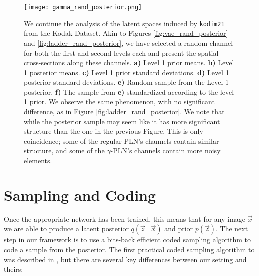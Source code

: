 \begin{figure}
  \centering
  \texttt{[image: gamma\_rand\_posterior.png]}
  \caption{We continue the analysis of the latent spaces induced by
    \texttt{kodim21} from the Kodak Dataset. Akin to Figures
    \ref{fig:vae_rand_posterior} and \ref{fig:ladder_rand_posterior},
    we have selected a random channel for both the
    first and second levels each and present the spatial cross-sections along these
    channels. \textbf{a)} Level 1 prior means. \textbf{b)} Level 1 posterior means.
    \textbf{c)} Level 1 prior standard deviations. \textbf{d)} Level 1 posterior
    standard deviations. \textbf{e)} Random sample from the Level 1 posterior.
    \textbf{f)} The sample from \textbf{e)} standardized according to the level
    1 prior. We observe the same phenomenon, with no significant difference, as
    in Figure \ref{fig:ladder_rand_posterior}. We note that while the posterior
    sample may seem like it has more significant structure than the one in the
    previous Figure. This is only coincidence; some of the regular PLN's
    channels contain similar structure, and some of the $\gamma$-PLN's channels
    contain more noisy elements.
  }
  \label{fig:gamma_rand_posterior}
\end{figure}

\section{Sampling and Coding}
\label{sec:coded_sampling}
\par
Once the appropriate network has been trained, this means that for any image $\vec{x}$
we are able to produce a latent posterior $q(\vec{z} \mid \vec{x})$ and prior
$p(\vec{z})$. The next step in our framework is to use a bits-back efficient coded sampling
algorithm to code a sample from the posterior. The first practical coded
sampling algorithm to was described in \cite{havasi2018minimal}, but there
are several key differences between our setting and theirs:

